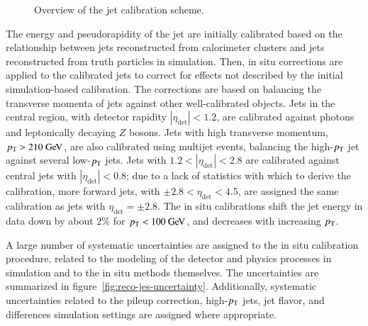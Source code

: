 \begin{figure}[htbp]
	\centering
	\caption{Overview of the jet calibration scheme. }
	\label{fig:reco-jet-calibration-flowchart}
\end{figure}


The energy and pseudorapidity of the jet are initially calibrated based on the relationship between jets reconstructed from calorimeter clusters and jets reconstructed from truth particles in simulation. Then, in situ corrections are applied to the calibrated jets to correct for effects not described by the initial simulation-based calibration. The corrections are based on balancing the transverse momenta of jets against other well-calibrated objects. Jets in the central region, with detector rapidity $|\eta_{\mathrm{det}}|<1.2$, are calibrated against photons and leptonically decaying $Z$ bosons. Jets with high transverse momentum, $\pt>210 \GeV$, are also calibrated using multijet events, balancing the high-$p_{\text{T}}$ jet against several low-$p_{\text{T}}$ jets. Jets with $1.2<|\eta_{\mathrm{det}}|<2.8$ are calibrated against central jets with $|\eta_{\mathrm{det}}|<0.8$; due to a lack of statistics with which to derive the calibration, more forward jets, with $\pm2.8<\eta_{\mathrm{det}}<4.5$, are assigned the same calibration as jets with $\eta_{\mathrm{det}}=\pm2.8$. The in situ calibrations shift the jet energy in data down by about $2\%$ for $\pt<100 \GeV$, and decreases with increasing $p_{\text{T}}$. 

A large number of systematic uncertainties are assigned to the in situ calibration procedure, related to the modeling of the detector and physics processes in simulation and to the in situ methods themselves. The uncertainties are summarized in figure~\ref{fig:reco-jes-uncertainty}. Additionally, systematic uncertainties related to the pileup correction, high-$p_{\text{T}}$ jets, jet flavor, and differences simulation settings are assigned where appropriate.

